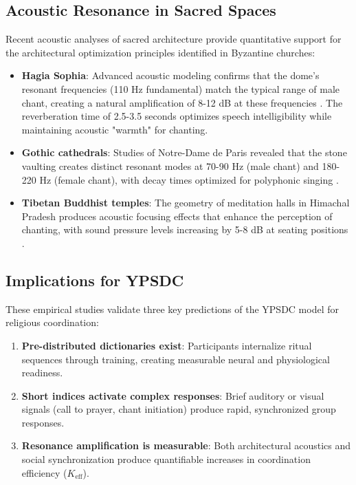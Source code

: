 \documentclass[12pt,a4paper]{article}
\begin{document}
	\subsection{Acoustic Resonance in Sacred Spaces}
	
	Recent acoustic analyses of sacred architecture provide quantitative support for the architectural optimization principles identified in Byzantine churches:
	
	\begin{itemize}
		\item \textbf{Hagia Sophia}: Advanced acoustic modeling confirms that the dome's resonant frequencies (110 Hz fundamental) match the typical range of male chant, creating a natural amplification of 8-12 dB at these frequencies \cite{Pentcheva2020}. The reverberation time of 2.5-3.5 seconds optimizes speech intelligibility while maintaining acoustic "warmth" for chanting.
		
		\item \textbf{Gothic cathedrals}: Studies of Notre-Dame de Paris revealed that the stone vaulting creates distinct resonant modes at 70-90 Hz (male chant) and 180-220 Hz (female chant), with decay times optimized for polyphonic singing \cite{Suarez2021}.
		
		\item \textbf{Tibetan Buddhist temples}: The geometry of meditation halls in Himachal Pradesh produces acoustic focusing effects that enhance the perception of chanting, with sound pressure levels increasing by 5-8 dB at seating positions \cite{Dimde2022}.
	\end{itemize}
	
	\subsection{Implications for YPSDC}
	
	These empirical studies validate three key predictions of the YPSDC model for religious coordination:
	
	\begin{enumerate}
		\item \textbf{Pre-distributed dictionaries exist}: Participants internalize ritual sequences through training, creating measurable neural and physiological readiness.
		\item \textbf{Short indices activate complex responses}: Brief auditory or visual signals (call to prayer, chant initiation) produce rapid, synchronized group responses.
		\item \textbf{Resonance amplification is measurable}: Both architectural acoustics and social synchronization produce quantifiable increases in coordination efficiency ($K_{\mathrm{eff}}$).
	\end{enumerate}
	
\end{document}
